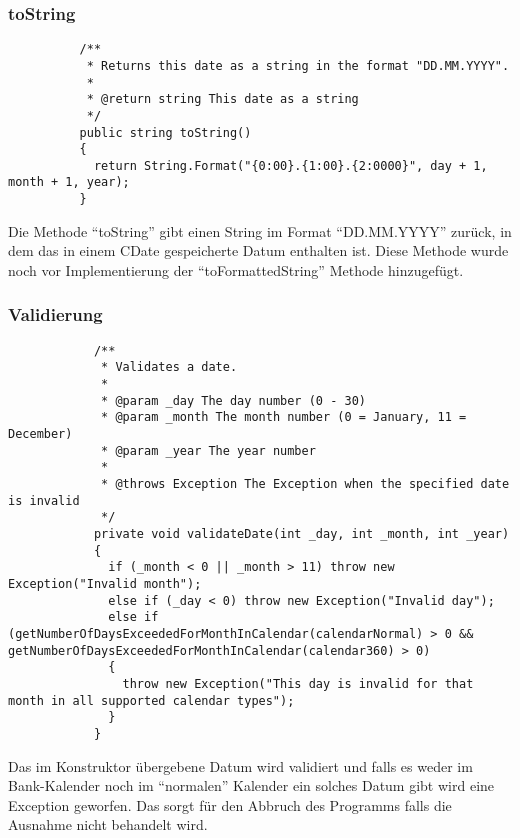 \documentclass[12pt,pdftex,parskip=half]{scrartcl}
\begin{document}
        \subsubsection{toString}

        \begin{lstlisting}
          /**
           * Returns this date as a string in the format "DD.MM.YYYY".
           *
           * @return string This date as a string
           */
          public string toString()
          {
            return String.Format("{0:00}.{1:00}.{2:0000}", day + 1, month + 1, year);
          }
        \end{lstlisting}

        Die Methode "`toString"' gibt einen String im Format "`DD.MM.YYYY"' zurück, in dem das in einem CDate gespeicherte Datum enthalten ist.
        Diese Methode wurde noch vor Implementierung der "`toFormattedString"' Methode hinzugefügt.

        \clearpage


        \subsubsection{Validierung}

        \begin{lstlisting}
            /**
             * Validates a date.
             *
             * @param _day The day number (0 - 30)
             * @param _month The month number (0 = January, 11 = December)
             * @param _year The year number
             *
             * @throws Exception The Exception when the specified date is invalid
             */
            private void validateDate(int _day, int _month, int _year)
            {
              if (_month < 0 || _month > 11) throw new Exception("Invalid month");
              else if (_day < 0) throw new Exception("Invalid day");
              else if (getNumberOfDaysExceededForMonthInCalendar(calendarNormal) > 0 && getNumberOfDaysExceededForMonthInCalendar(calendar360) > 0)
              {
                throw new Exception("This day is invalid for that month in all supported calendar types");
              }
            }
        \end{lstlisting}

        Das im Konstruktor übergebene Datum wird validiert und falls es weder im Bank-Kalender noch im "`normalen"' Kalender ein solches Datum gibt wird eine Exception geworfen. Das sorgt für den Abbruch des Programms falls die Ausnahme nicht behandelt wird.
\end{document}
